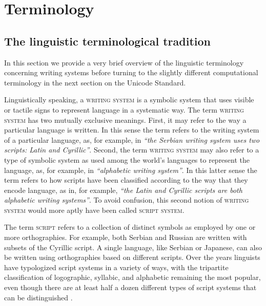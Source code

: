 \chapter{Terminology}
\label{terminology}

\section{The linguistic terminological tradition}
\label{the-linguistic-tradition}

In this section we provide a very brief overview of the linguistic terminology concerning writing systems before turning to the slightly different computational terminology in the next section on the Unicode Standard. 

Linguistically speaking, a \textsc{writing system} is a symbolic system that uses visible or tactile signs to represent language in a systematic way. The term \textsc{writing system} has two mutually exclusive meanings. First, it may refer to the way a particular language is written. In this sense the term refers to the writing system of a particular language, as, for example, in \emph{``the Serbian writing system uses two scripts: Latin and Cyrillic''}. Second, the term \textsc{writing system} may also refer to a type of symbolic system as used among the world's languages to represent the language, as, for example, in \emph{``alphabetic writing system''}. In this latter sense the term refers to how scripts have been classified according to the way that they encode language, as in, for example, \emph{``the Latin and Cyrillic scripts are both alphabetic writing systems''}. To avoid confusion, this second notion of \textsc{writing system} would more aptly have been called \textsc{script system}. 

The term \textsc{script} refers to a collection of distinct symbols as employed by one or more orthographies. For example, both Serbian and Russian are written with subsets of the Cyrillic script. A single language, like Serbian or Japanese, can also be written using orthographies based on different scripts. Over the years linguists have typologized script systems in a variety of ways, with the tripartite classification of logographic, syllabic, and alphabetic remaining the most popular, even though there are at least half a dozen different types of script systems that can be distinguished \citep{Daniels1990,Daniels1996}.

